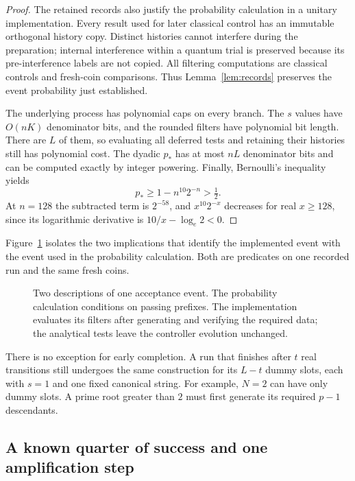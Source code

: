 \begin{proof}
The retained records also justify the probability calculation in a unitary implementation. Every result used for later classical control has an immutable orthogonal history copy. Distinct histories cannot interfere during the preparation; internal interference within a quantum trial is preserved because its pre-interference labels are not copied. All filtering computations are classical controls and fresh-coin comparisons. Thus Lemma~\ref{lem:records} preserves the event probability just established.

The underlying process has polynomial caps on every branch. The $s$ values have $O(nK)$ denominator bits, and the rounded filters have polynomial bit length. There are $L$ of them, so evaluating all deferred tests and retaining their histories still has polynomial cost. The dyadic $p_*$ has at most $nL$ denominator bits and can be computed exactly by integer powering. Finally, Bernoulli's inequality yields
\[
 p_*\ge1-n^{10}2^{-n}>\tfrac12.
\]
At $n=128$ the subtracted term is $2^{-58}$, and $x^{10}2^{-x}$ decreases for real $x\ge128$, since its logarithmic derivative is $10/x-\log_e2<0$.
\end{proof}

Figure~\ref{fig:same-history-events} isolates the two implications that identify the implemented event with the event used in the probability calculation. Both are predicates on one recorded run and the same fresh coins.

\begin{figure}[tb]
\centering

\caption{Two descriptions of one acceptance event. The probability calculation conditions on passing prefixes. The implementation evaluates its filters after generating and verifying the required data; the analytical tests leave the controller evolution unchanged.}
\label{fig:same-history-events}
\end{figure}

There is no exception for early completion. A run that finishes after $t$ real transitions still undergoes the same construction for its $L-t$ dummy slots, each with $s=1$ and one fixed canonical string. For example, $N=2$ can have only dummy slots. A prime root greater than $2$ must first generate its required $p-1$ descendants.

\subsection{A known quarter of success and one amplification step}

